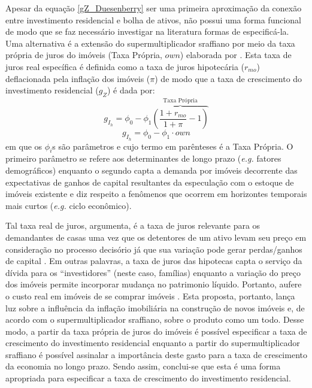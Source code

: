 Apesar da equação \ref{gZ_Duesenberry} ser uma primeira aproximação da conexão entre investimento residencial e bolha de ativos, não possui uma forma funcional de modo que se faz necessário investigar na literatura formas de especificá-la.
Uma alternativa é a extensão do supermultiplicador sraffiano por meio da taxa própria de juros do imóveis (Taxa Própria, $own$) elaborada por \textcite{teixeira_crescimento_2015}. 
Esta taxa de juros real específica é definida como a taxa de juros hipotecária ($r_{mo}$) deflacionada pela inflação dos imóveis ({$\pi$}) de modo que a taxa de crescimento do investimento residencial ($g_Z$) é dada por:
$$
g_{I_h} = \phi_0 - \phi_1 \overbrace{\left(\frac{1+r_{mo}}{1+\pi} - 1\right)}^{\text{Taxa Própria}}
$$
\begin{equation}
\label{tx_Propria}
g_{I_h} = \phi_0 - \phi_1\cdot own
\end{equation}
em que os $\phi_i$s são parâmetros e cujo termo em parênteses é a Taxa Própria. 
O primeiro parâmetro se refere aos determinantes de longo prazo (\textit{e.g.} fatores demográficos) enquanto o segundo capta a demanda por imóveis decorrente das expectativas de ganhos de capital resultantes da especulação com o estoque de imóveis existente e diz respeito a fenômenos que ocorrem em horizontes temporais mais curtos (\textit{e.g.} ciclo econômico). 

Tal taxa real de juros, argumenta, é a taxa de juros relevante para os demandantes de casas uma vez que os detentores de um ativo levam seu preço em consideração no processo decisório já que sua variação pode gerar perdas/ganhos de capital \cite[p.~144]{teixeira_crescimento_2015}.
Em outras palavras, a taxa de juros das hipotecas capta o serviço da dívida para os ``investidores'' (neste caso, famílias) enquanto a variação do preço dos imóveis permite incorporar mudança no patrimonio líquido. Portanto, aufere o custo real em imóveis de se comprar imóveis \cite[p.~53]{teixeira_crescimento_2015}. 
Esta proposta, portanto, lança luz sobre a influência da inflação imobiliária na construção de novos imóveis e, de acordo com o supermultiplicador sraffiano, sobre o produto como um todo. 
Desse modo, a partir da taxa própria de juros do imóveis é possível especificar a taxa de crescimento do investimento residencial enquanto a partir do supermultiplicador sraffiano é possível assinalar a importância deste gasto para a taxa de crescimento da economia no longo prazo.  
Sendo assim, conclui-se que esta é uma forma apropriada para especificar a taxa de crescimento do investimento residencial.

